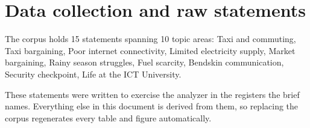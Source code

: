 \documentclass[11pt,a4paper]{article}
\begin{document}
\section{Data collection and raw statements}
\label{sec:data-collection-and-raw-statements}
The corpus holds 15 statements spanning 10 topic areas: Taxi and commuting, Taxi bargaining, Poor internet connectivity, Limited electricity supply, Market bargaining, Rainy season struggles, Fuel scarcity, Bendskin communication, Security checkpoint, Life at the ICT University.

These statements were written to exercise the analyzer in the registers the brief names. Everything else in this document is derived from them, so replacing the corpus regenerates every table and figure automatically.

\begingroup
\footnotesize
{}
\end{document}
